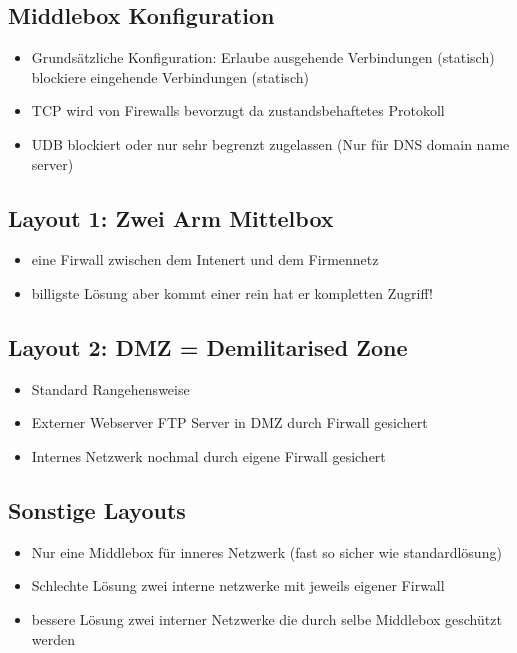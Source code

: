\documentclass[a4paper,10pt]{scrartcl}
\begin{document}
    \subsection{Middlebox Konfiguration }
   \begin{itemize}
    \item Grundsätzliche Konfiguration: Erlaube ausgehende Verbindungen (statisch) blockiere eingehende Verbindungen (statisch) 
    \item TCP wird von Firewalls bevorzugt da zustandsbehaftetes Protokoll
    \item UDB blockiert oder nur sehr begrenzt zugelassen (Nur für DNS domain name server)
   \end{itemize}

       \subsection{Layout 1: Zwei Arm Mittelbox}
       \begin{itemize}
        \item eine Firwall zwischen dem Intenert und dem Firmennetz
        \item billigste Lösung aber kommt einer rein hat er kompletten Zugriff!
       \end{itemize}
       \subsection{Layout 2: DMZ = Demilitarised Zone }
       \begin{itemize}
        \item Standard Rangehensweise
        \item Externer Webserver FTP Server in DMZ durch Firwall gesichert
        \item Internes Netzwerk nochmal durch eigene Firwall gesichert
       \end{itemize}
       \subsection{Sonstige Layouts}
              \begin{itemize}
               \item Nur eine Middlebox für inneres Netzwerk (fast so sicher wie standardlösung)
               \item Schlechte Lösung zwei interne netzwerke mit jeweils eigener Firwall
               \item bessere Lösung zwei interner Netzwerke die durch selbe Middlebox geschützt werden
              \end{itemize}



 
\end{document}
